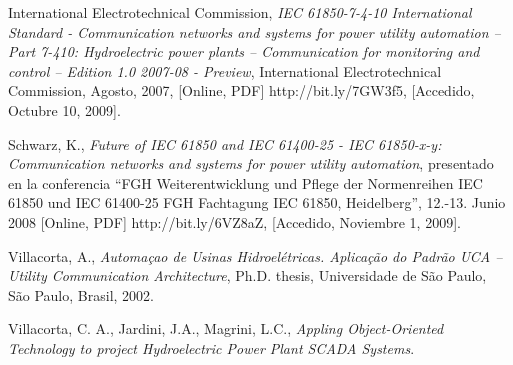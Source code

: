 \documentclass[conference,twocolumn]{IEEEtran}
\begin{document}
\begin{thebibliography}{1}
		International Electrotechnical Commission, \emph{IEC 61850-7-4-10 International Standard - Communication networks and systems for power utility automation – Part 7-410: Hydroelectric power plants – Communication for monitoring and control – Edition 		1.0 2007-08 - Preview}, International Electrotechnical Commission, Agosto, 2007, [Online, PDF] http://bit.ly/7GW3f5, [Accedido, Octubre 10, 2009].

		Schwarz, K., \emph{Future of IEC 61850 and IEC 61400-25 - IEC 61850-x-y: Communication networks and systems for power utility automation}, presentado en la conferencia “FGH Weiterentwicklung und Pflege der Normenreihen IEC 61850 und IEC 	61400-25 FGH Fachtagung IEC 61850, Heidelberg”, 12.-13. Junio 2008  [Online, PDF]  http://bit.ly/6VZ8aZ, [Accedido, Noviembre 1, 2009].

		Villacorta, A., \emph{Automaçao de Usinas Hidroel\'etricas. Aplicação do Padrão UCA – Utility Communication Architecture}, Ph.D. thesis, Universidade de São Paulo, São Paulo, Brasil, 2002.

		Villacorta, C. A., Jardini, J.A., Magrini, L.C., \emph{Appling Object-Oriented Technology to project Hydroelectric Power Plant SCADA Systems}.

\end{thebibliography}




\end{document}
